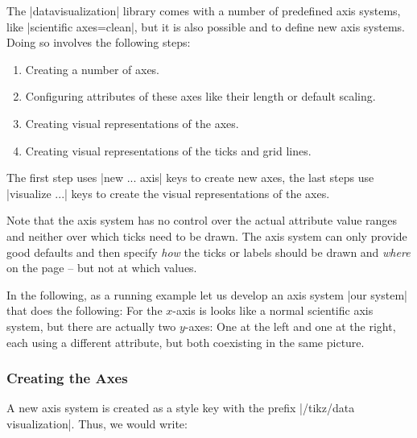 The |datavisualization| library comes with a number of predefined axis systems, like |scientific axes=clean|, but it is also possible and to define new axis systems. Doing so involves the following steps:
%
\begin{enumerate}
    \item Creating a number of axes.
    \item Configuring attributes of these axes like their length or default
        scaling.
    \item Creating visual representations of the axes.
    \item Creating visual representations of the ticks and grid lines.
\end{enumerate}

The first step uses |new ... axis| keys to create new axes, the last steps use |visualize ...| keys to create the visual representations of the axes.

Note that the axis system has no control over the actual attribute value ranges and neither over which ticks need to be drawn. The axis system can only provide good defaults and then specify \emph{how} the ticks or labels should be drawn and \emph{where} on the page -- but not at which values.

In the following, as a running example let us develop an axis system |our system| that does the following: For the $x$-axis is looks like a normal scientific axis system, but there are actually two $y$-axes: One at the left and one at the right, each using a different attribute, but both coexisting in the same picture.


\subsubsection{Creating the Axes}

A new axis system is created as a style key with the prefix |/tikz/data visualization|. Thus, we would write:
%
\begin{codeexample}
\end{codeexample}

